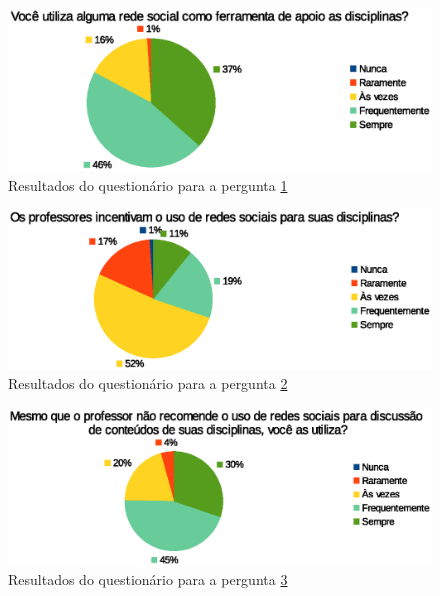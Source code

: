 \begin{apendicesenv}
\begin{figure}[h]
    \centering
    \includegraphics[keepaspectratio=true,scale=0.55]
      {figuras/pergunta2p.eps}
    \caption{Resultados do questionário para a pergunta \ref{pergunta2}}
    \label{pergunta2}
\end{figure}

\begin{figure}[h]
    \centering
    \includegraphics[keepaspectratio=true,scale=0.55]
      {figuras/pergunta3p.eps}
    \caption{Resultados do questionário para a pergunta \ref{pergunta3}}
    \label{pergunta3}
\end{figure}

\begin{figure}[h]
    \centering
    \includegraphics[keepaspectratio=true,scale=0.55]
      {figuras/pergunta4p.eps}
    \caption{Resultados do questionário para a pergunta \ref{pergunta4}}
    \label{pergunta4}
\end{figure}

\end{apendicesenv}
